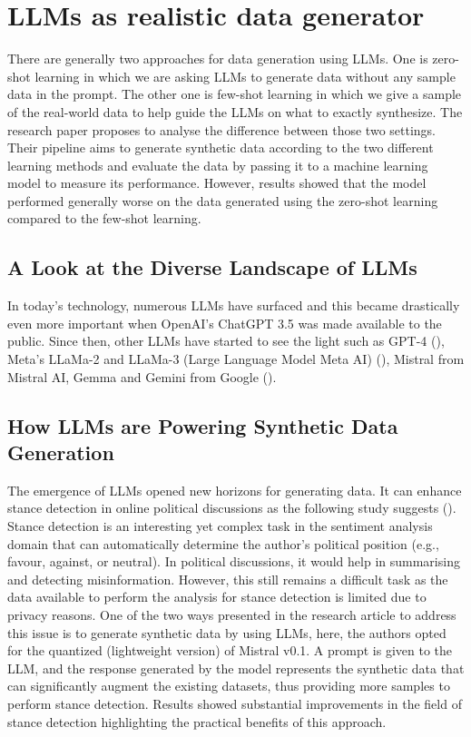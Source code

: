 \section{LLMs as realistic data generator}

There are generally two approaches for data generation using LLMs. One is zero-shot learning in which we are asking LLMs to generate data without any sample data in the prompt. The other one is few-shot learning in which we give a sample of the real-world data to help guide the LLMs on what to exactly synthesize. The research paper \cite{Li2023} proposes to analyse the difference between those two settings. Their pipeline aims to generate synthetic data according to the two different learning methods and evaluate the data by passing it to a machine learning model to measure its performance. However, results showed that the model performed generally worse on the data generated using the zero-shot learning compared to the few-shot learning.

\subsection{A Look at the Diverse Landscape of LLMs}

In today's technology, numerous LLMs have surfaced and this became drastically even more important when OpenAI's ChatGPT 3.5 was made available to the public. Since then, other LLMs have started to see the light such as GPT-4 (\cite{OpenAI2023}), Meta's LLaMa-2 and LLaMa-3 (Large Language Model Meta AI) (\cite{touvron2023llama2, touvron2023llama}), Mistral from Mistral AI, Gemma and Gemini from Google (\cite{touvron2024gemini}).


\subsection{How LLMs are Powering Synthetic Data Generation}


The emergence of LLMs opened new horizons for generating data. It can enhance stance detection in online political discussions as the following study suggests (\cite{Wagner2024}). Stance detection is an interesting yet complex task in the sentiment analysis domain that can automatically determine the author's political position (e.g., favour, against, or neutral). In political discussions, it would help in summarising and detecting misinformation. However, this still remains a difficult task as the data available to perform the analysis for stance detection is limited due to privacy reasons. One of the two ways presented in the research article to address this issue is to generate synthetic data by using LLMs, here, the authors opted for the quantized (lightweight version) of Mistral v0.1. A prompt is given to the LLM, and the response generated by the model represents the synthetic data that can significantly augment the existing datasets, thus providing more samples to perform stance detection. Results showed substantial improvements in the field of stance detection highlighting the practical benefits of this approach.


